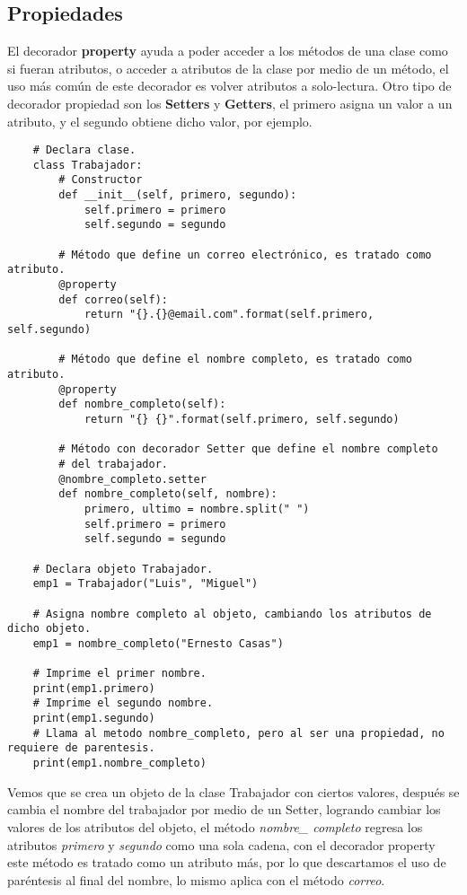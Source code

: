 \subsection{Propiedades}

El decorador \textbf{property} ayuda a poder acceder a los métodos de una clase como si fueran atributos, o acceder a atributos de la clase por medio de un método, el uso más común de este decorador es volver atributos a solo-lectura. Otro tipo de decorador propiedad son los \textbf{Setters} y \textbf{Getters}, el primero asigna un valor a un atributo, y el segundo obtiene dicho valor, por ejemplo.
\begin{lstlisting}
    # Declara clase.
    class Trabajador:
        # Constructor
        def __init__(self, primero, segundo):
            self.primero = primero
            self.segundo = segundo

        # Método que define un correo electrónico, es tratado como atributo.
        @property
        def correo(self):
            return "{}.{}@email.com".format(self.primero, self.segundo)

        # Método que define el nombre completo, es tratado como atributo.
        @property
        def nombre_completo(self):
            return "{} {}".format(self.primero, self.segundo)

        # Método con decorador Setter que define el nombre completo
        # del trabajador.
        @nombre_completo.setter
        def nombre_completo(self, nombre):
            primero, ultimo = nombre.split(" ")
            self.primero = primero
            self.segundo = segundo

    # Declara objeto Trabajador.
    emp1 = Trabajador("Luis", "Miguel")
   
    # Asigna nombre completo al objeto, cambiando los atributos de dicho objeto.
    emp1 = nombre_completo("Ernesto Casas")

    # Imprime el primer nombre.
    print(emp1.primero)
    # Imprime el segundo nombre.
    print(emp1.segundo)
    # Llama al metodo nombre_completo, pero al ser una propiedad, no requiere de parentesis.
    print(emp1.nombre_completo)
\end{lstlisting}

Vemos que se crea un objeto de la clase Trabajador con ciertos valores, después se cambia el nombre del trabajador por medio de un Setter, logrando cambiar los valores de los atributos del objeto, el método \textit{nombre\_ completo} regresa los atributos \textit{primero} y \textit{segundo} como una sola cadena, con el decorador property este método es tratado como un atributo más, por lo que descartamos el uso de paréntesis al final del nombre, lo mismo aplica con el método \textit{correo}.



